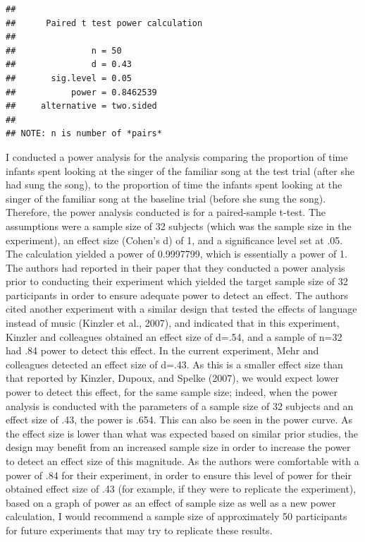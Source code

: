 \documentclass[
  english,
  man]{apa6}
\begin{document}
\begin{verbatim}
## 
##      Paired t test power calculation 
## 
##               n = 50
##               d = 0.43
##       sig.level = 0.05
##           power = 0.8462539
##     alternative = two.sided
## 
## NOTE: n is number of *pairs*
\end{verbatim}

I conducted a power analysis for the analysis comparing the proportion of time infants spent looking at the singer of the familiar song at the test trial (after she had sung the song), to the proportion of time the infants spent looking at the singer of the familiar song at the baseline trial (before she sung the song). Therefore, the power analysis conducted is for a paired-sample t-test. The assumptions were a sample size of 32 subjects (which was the sample size in the experiment), an effect size (Cohen's d) of 1, and a significance level set at .05. The calculation yielded a power of 0.9997799, which is essentially a power of 1. The authors had reported in their paper that they conducted a power analysis prior to conducting their experiment which yielded the target sample size of 32 participants in order to ensure adequate power to detect an effect. The authors cited another experiment with a similar design that tested the effects of language instead of music (Kinzler et al., 2007), and indicated that in this experiment, Kinzler and colleagues obtained an effect size of d=.54, and a sample of n=32 had .84 power to detect this effect. In the current experiment, Mehr and colleagues detected an effect size of d=.43. As this is a smaller effect size than that reported by Kinzler, Dupoux, and Spelke (2007), we would expect lower power to detect this effect, for the same sample size; indeed, when the power analysis is conducted with the parameters of a sample size of 32 subjects and an effect size of .43, the power is .654. This can also be seen in the power curve. As the effect size is lower than what was expected based on similar prior studies, the design may benefit from an increased sample size in order to increase the power to detect an effect size of this magnitude. As the authors were comfortable with a power of .84 for their experiment, in order to ensure this level of power for their obtained effect size of .43 (for example, if they were to replicate the experiment), based on a graph of power as an effect of sample size as well as a new power calculation, I would recommend a sample size of approximately 50 participants for future experiments that may try to replicate these results.
\end{document}

